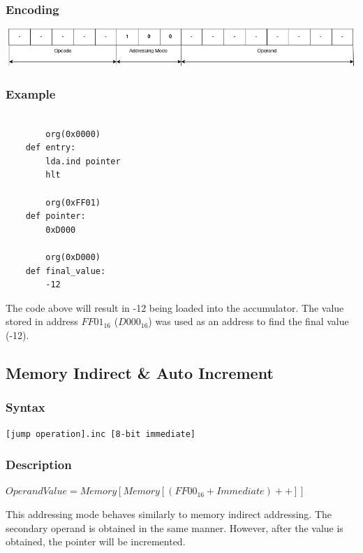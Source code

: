 \subsubsection{Encoding}
\begin{center}
    \includegraphics[scale=0.40]{img/Andromeda-IND.drawio}
\end{center}

\subsubsection{Example}
\begin{verbatim}

        org(0x0000)
    def entry:
        lda.ind pointer
        hlt

        org(0xFF01)
    def pointer:
        0xD000

        org(0xD000)
    def final_value:
        -12

\end{verbatim}
The code above will result in -12 being loaded into the accumulator.
The value stored in address $FF01_{16}$ ($D000_{16}$) was used as an address to find the final value (-12).
\pagebreak

\subsection{Memory Indirect \& Auto Increment}\label{subsec:memory-indirect-&-auto-increment-(inc)}
\subsubsection{Syntax}
\begin{verbatim}[jump operation].inc [8-bit immediate]\end{verbatim}

\subsubsection{Description}
$OperandValue = Memory[Memory[(FF00_{16} + Immediate)++]]$\\
\par This addressing mode behaves similarly to memory indirect addressing.
The secondary operand is obtained in the same manner.
However, after the value is obtained, the pointer will be incremented.

